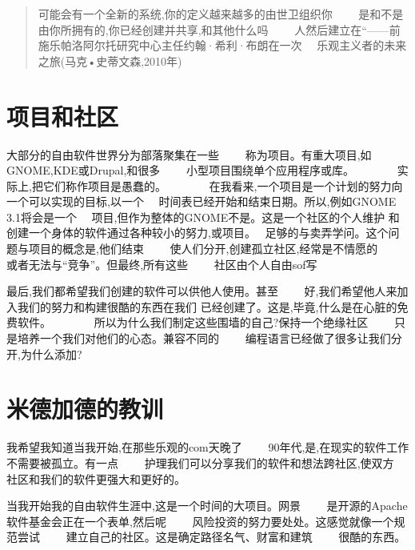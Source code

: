 

\begin{quote}
可能会有一个全新的系统,你的定义越来越多的由世卫组织你　　
是和不是由你所拥有的,你已经创建并共享,和其他什么吗　　
人然后建立在“——前施乐帕洛阿尔托研究中心主任约翰·希利·布朗在一次　
乐观主义者的未来之旅(马克•史蒂文森,2010年)
\end{quote}

\section*{项目和社区}

大部分的自由软件世界分为部落聚集在一些　　
称为项目。有重大项目,如GNOME,KDE或Drupal,和很多　　
小型项目围绕单个应用程序或库。　　　　
实际上,把它们称作项目是愚蠢的。　　　　
在我看来,一个项目是一个计划的努力向一个可以实现的目标,以一个　
时间表已经开始和结束日期。所以,例如GNOME 3.1将会是一个　
项目,但作为整体的GNOME不是。这是一个社区的个人维护
和创建一个身体的软件通过各种较小的努力,或项目。　
足够的与卖弄学问。这个问题与项目的概念是,他们结束　　
使人们分开,创建孤立社区,经常是不情愿的　　
或者无法与“竞争”。但最终,所有这些　　
社区由个人自由sof写

最后,我们都希望我们创建的软件可以供他人使用。甚至　　
好,我们希望他人来加入我们的努力和构建很酷的东西在我们
已经创建了。这是,毕竟,什么是在心脏的免费软件。　　　　
所以为什么我们制定这些围墙的自己?保持一个绝缘社区　　
只是培养一个我们对他们的心态。兼容不同的　　
编程语言已经做了很多让我们分开,为什么添加?

\section*{米德加德的教训}

我希望我知道当我开始,在那些乐观的com天晚了　　
90年代,是,在现实的软件工作不需要被孤立。有一点　　
护理我们可以分享我们的软件和想法跨社区,使双方　　
社区和我们的软件更强大和更好的。

当我开始我的自由软件生涯中,这是一个时间的大项目。网景　　
是开源的Apache软件基金会正在一个表单,然后呢　　
风险投资的努力要处处。这感觉就像一个规范尝试　　
建立自己的社区。这是确定路径名气、财富和建筑　　
很酷的东西。

